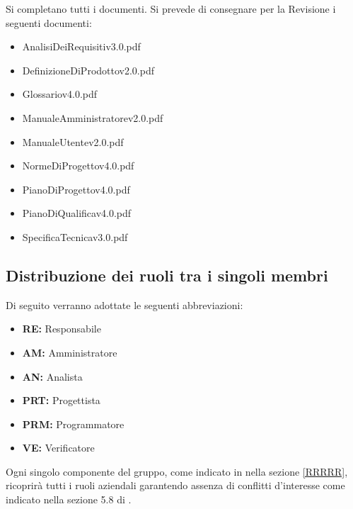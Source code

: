 {{\begin{itemize}
		\end{itemize}
		 Si completano tutti i documenti.
		 Si prevede di consegnare per la Revisione i seguenti documenti:
		 \begin{itemize}
		 	\item AnalisiDeiRequisiti\textunderscore v3.0.pdf
		 	\item DefinizioneDiProdotto\textunderscore v2.0.pdf
		 	\item Glossario\textunderscore v4.0.pdf
		 	\item ManualeAmministratore\textunderscore v2.0.pdf
		 	\item ManualeUtente\textunderscore v2.0.pdf
		 	\item NormeDiProgetto\textunderscore v4.0.pdf
		 	\item PianoDiProgetto\textunderscore v4.0.pdf
		 	\item PianoDiQualifica\textunderscore v4.0.pdf
		 	\item SpecificaTecnica\textunderscore v3.0.pdf
		 \end{itemize}
	}
	\newpage
	
	\subsection{Distribuzione dei ruoli tra i singoli membri}{
	 Di seguito verranno adottate le seguenti abbreviazioni:
	\begin{itemize}
		\item []\textbf{RE:}	 Responsabile
		\item []\textbf{AM:} Amministratore
		\item []\textbf{AN:}	Analista
		\item []\textbf{PRT:} Progettista
		\item []\textbf{PRM:} Programmatore
		\item []\textbf{VE:} Verificatore
	\end{itemize}		 
	Ogni singolo componente del gruppo, come indicato in nella sezione \ref{RRRRR}, ricoprirà tutti i ruoli aziendali garantendo assenza di conflitti d'interesse come indicato nella sezione 5.8 di \emph{\NormeDiProgetto}.
}}
